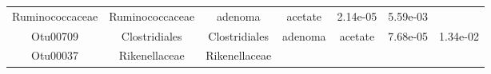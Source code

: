 \documentclass[11pt,]{article}
\begin{document}
\begin{longtable}[]{@{}ccccccc@{}}
\begin{minipage}[t]{0.17\columnwidth}
Ruminococcaceae\strut
\end{minipage} & \begin{minipage}[t]{0.17\columnwidth}\centering\strut
Ruminococcaceae\strut
\end{minipage} & \begin{minipage}[t]{0.09\columnwidth}\centering\strut
adenoma\strut
\end{minipage} & \begin{minipage}[t]{0.11\columnwidth}\centering\strut
acetate\strut
\end{minipage} & \begin{minipage}[t]{0.09\columnwidth}\centering\strut
2.14e-05\strut
\end{minipage} & \begin{minipage}[t]{0.09\columnwidth}\centering\strut
5.59e-03\strut
\end{minipage}\tabularnewline
\begin{minipage}[t]{0.09\columnwidth}\centering\strut
Otu00709\strut
\end{minipage} & \begin{minipage}[t]{0.17\columnwidth}\centering\strut
Clostridiales\strut
\end{minipage} & \begin{minipage}[t]{0.17\columnwidth}\centering\strut
Clostridiales\strut
\end{minipage} & \begin{minipage}[t]{0.09\columnwidth}\centering\strut
adenoma\strut
\end{minipage} & \begin{minipage}[t]{0.11\columnwidth}\centering\strut
acetate\strut
\end{minipage} & \begin{minipage}[t]{0.09\columnwidth}\centering\strut
7.68e-05\strut
\end{minipage} & \begin{minipage}[t]{0.09\columnwidth}\centering\strut
1.34e-02\strut
\end{minipage}\tabularnewline
\begin{minipage}[t]{0.09\columnwidth}\centering\strut
Otu00037\strut
\end{minipage} & \begin{minipage}[t]{0.17\columnwidth}\centering\strut
Rikenellaceae\strut
\end{minipage} & \begin{minipage}[t]{0.17\columnwidth}\centering\strut
Rikenellaceae\strut
\end{minipage} & \begin{minipage}[t]{0.09\columnwidth}\centering\strut

\end{minipage}
\end{longtable}
\end{document}
